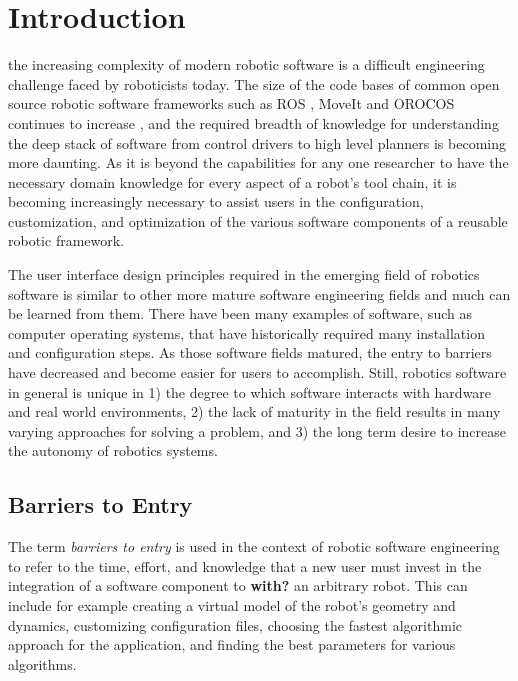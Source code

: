 \documentclass[10pt,journal,compsoc]{joser1}
\begin{document}
\section{Introduction}
 {the increasing complexity of modern robotic software is a difficult engineering challenge faced by roboticists today. The size of the code bases of common open source robotic software frameworks such as ROS \cite{quigley2009ros}, MoveIt \cite{moveit} and OROCOS \cite{bruyninckx2001open} continues to increase \cite{makarenko2007benefits}, and the required breadth of knowledge for understanding the deep stack of software from control drivers to high level planners is becoming more daunting. As it is beyond the capabilities for any one researcher to have the necessary domain knowledge for every aspect of a robot's tool chain, it is becoming increasingly necessary to assist users in the configuration, customization, and optimization of the various software components of a reusable robotic framework. 

The user interface design principles required in the emerging field of robotics software is similar to other more mature software engineering fields and much can be learned from them. There have been many examples of software, such as computer operating systems, that have historically required many installation and configuration steps. As those software fields matured, the entry to barriers have decreased and become easier for users to accomplish. Still, robotics software in general is unique in 1) the degree to which software interacts with hardware and real world environments, 2) the lack of maturity in the field results in many varying approaches for solving a problem, and 3) the long term desire to increase the autonomy of robotics systems. 

\subsection{Barriers to Entry}

The term \textit{barriers to entry} is used in the context of robotic software engineering to refer to the time, effort, and knowledge that a new user must invest in the integration of a software component to \textbf{ with?} an arbitrary robot. This can include for example creating a virtual model of the robot's geometry and dynamics, customizing configuration files, choosing the fastest algorithmic approach for the application, and finding the best parameters for various algorithms. 

}
\end{document}
